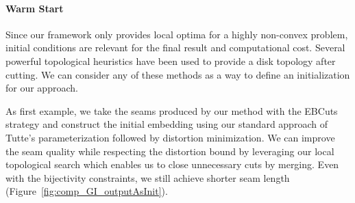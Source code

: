 \paragraph{Warm Start}
Since our framework only provides local optima for a highly non-convex problem, initial conditions are relevant for the final result and computational cost. Several powerful topological heuristics have been used to provide a disk topology after cutting. %
We can consider any of these methods as a way to define an initialization for our approach. 


As first example, we take the seams produced by our method with the EBCuts strategy and construct the initial embedding using our standard approach of Tutte's parameterization followed by distortion minimization. We can improve the seam quality while respecting the distortion bound by leveraging our local topological search which enables us to close unnecessary cuts by merging. Even with the bijectivity constraints, we still achieve shorter seam length (Figure~\ref{fig:comp_GI_outputAsInit}).

